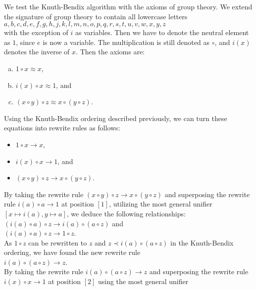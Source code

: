 \example
We test the Knuth-Bendix algorithm with the axioms of group theory.  We extend the signature of group theory to
contain all lowercase letters
\\[0.2cm]
\hspace*{1.3cm}
$a, b, c, d, e, f, g, h, j, k, l, m, n, o, p, q, r, s, t, u, v, w, x, y, z$ 
\\[0.2cm]
with the exception of $i$ as variables.
Then we have to denote the neutral element as $1$, since $e$ is now a variable.  The multiplication is still
denoted as $\circ$, and $i(x)$ denotes the inverse of $x$.  Then the axioms are: 
\begin{enumerate}[(a)]
\item $1 \circ x \approx x$,
\item $i(x) \circ x \approx 1$, and
\item $(x \circ y) \circ z \approx x \circ (y \circ z)$.
\end{enumerate}
Using the Knuth-Bendix ordering described previously, we can turn these equations into rewrite rules as follows: 
\begin{itemize}
\item $1 \circ x \rightarrow x$,
\item $i(x) \circ x \rightarrow 1$, and
\item $(x \circ y) \circ z \rightarrow x \circ (y \circ z)$.
\end{itemize}
By taking the rewrite rule $(x \circ y) \circ z \to x \circ (y \circ z)$ and superposing the rewrite rule
$i(a) \circ a \to 1$ at position $[1]$, utilizing the most general unifier $[x \mapsto i(a), y \mapsto a]$, we deduce 
the following relationships: 
\\[0.2cm]
\hspace*{1.3cm}
$(i(a) \circ a) \circ z \to i(a) \circ (a \circ z)$ \quad and \quad
\\[0.2cm]
\hspace*{1.3cm}
$(i(a) \circ a) \circ z \to 1 \circ z$.
\\[0.2cm]
As $1 \circ z$ can be rewritten to $z$ and  $z \prec i(a) \circ (a \circ z)$ in the Knuth-Bendix ordering, we have found the
new rewrite rule 
\\[0.2cm]
\hspace*{1.3cm}
$i(a) \circ (a \circ z) \rightarrow z$.
\\[0.2cm]
By taking the rewrite rule $i(a) \circ (a \circ z) \rightarrow z$ and superposing the rewrite rule  $i(x) \circ x \rightarrow 1$ at
position $[2]$ using the most general unifier
\\[0.2cm]
